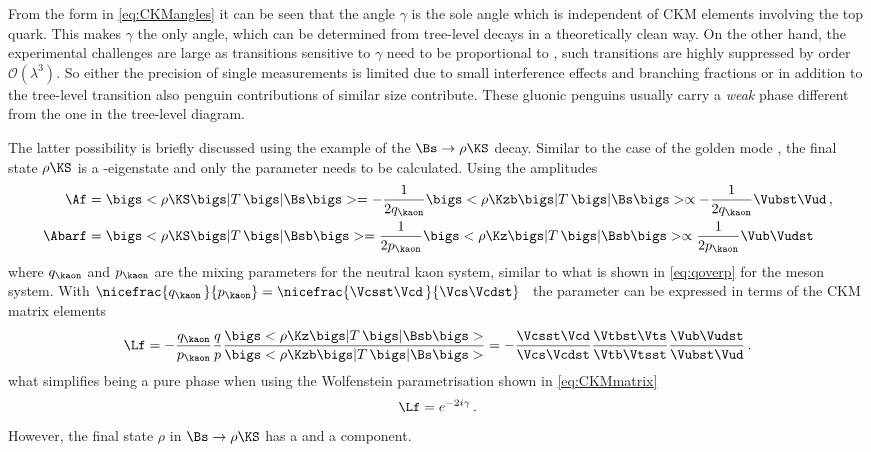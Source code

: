 From the form in \cref{eq:CKMangles} it can be seen that the angle $\gamma$ is the sole angle which is independent of CKM elements involving the top quark.
This makes $\gamma$ the only angle, which can be determined from tree-level decays in a theoretically clean way.
On the other hand, the experimental challenges are large as transitions sensitive to $\gamma$ need to be proportional to \Vub, \ie such transitions are highly suppressed by order $\mathcal{O}\!\left(\lambda^3\right)$.
So either the precision of single measurements is limited due to small interference effects and branching fractions or in addition to the tree-level transition also penguin contributions of similar size contribute.
These gluonic penguins usually carry a \emph{weak} phase different from the one in the tree-level diagram.

The latter possibility is briefly discussed using the example of the $\Bs\to\rho\KS$ decay.
Similar to the case of the golden mode \BdToJPsiKS, the final state $\rho\KS$ is a \CP-eigenstate and only the parameter \Lf needs to be calculated.
Using the amplitudes
\begin{equation}
\begin{aligned}
\Af&=\bigs<\rho\KS\bigs|T\,\bigs|\Bs\bigs>=-\frac{1}{2q_{\kaon}}\bigs<\rho\Kzb\bigs|T\,\bigs|\Bs\bigs>\propto-\frac{1}{2q_{\kaon}}\Vubst\Vud\,,\\
\Abarf&=\bigs<\rho\KS\bigs|T\,\bigs|\Bsb\bigs>=\frac{1}{2p_{\kaon}}\bigs<\rho\Kz\bigs|T\,\bigs|\Bsb\bigs>\propto\frac{1}{2p_{\kaon}}\Vub\Vudst
\end{aligned}
\end{equation}
where $q_{\kaon}$ and $p_{\kaon}$ are the mixing parameters for the neutral kaon system, similar to what is shown in \cref{eq:qoverp} for the \Bz meson system.
With $\nicefrac{q_{\kaon}\,}{p_{\kaon}}=\nicefrac{\Vcsst\Vcd\,}{\Vcs\Vcdst}$~\cite{Branco:396964} the parameter \Lf can be expressed in terms of the CKM matrix elements
\begin{equation}
\Lf=-\frac{q_{\kaon}}{p_{\kaon}}\frac{q}{p}\frac{\bigs<\rho\Kz\bigs|T\,\bigs|\Bsb\bigs>}{\bigs<\rho\Kzb\bigs|T\,\bigs|\Bs\bigs>}
=-\frac{\Vcsst\Vcd}{\Vcs\Vcdst}\frac{\Vtbst\Vts}{\Vtb\Vtsst}\frac{\Vub\Vudst}{\Vubst\Vud}\,.
\end{equation}
what simplifies \Lf being a pure phase when using the Wolfenstein parametrisation shown in \cref{eq:CKMmatrix}
\begin{equation}
\Lf=e^{-2i\gamma}\,.
\end{equation}
However, the final state $\rho$ in $\Bs\to\rho\KS$ has a \uquark\uquarkbar and a \dquark\dquarkbar component.
